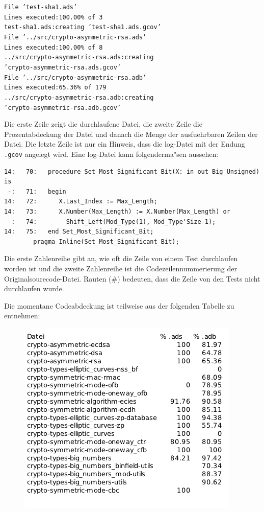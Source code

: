 {\tt File 'test-sha1.ads'\\
Lines executed:100.00\% of 3\\
test-sha1.ads:creating 'test-sha1.ads.gcov'\\

File '../src/crypto-asymmetric-rsa.ads'\\
Lines executed:100.00\% of 8\\
../src/crypto-asymmetric-rsa.ads:creating\\ 'crypto-asymmetric-rsa.ads.gcov'\\

File '../src/crypto-asymmetric-rsa.adb'\\
Lines executed:65.36\% of 179\\
../src/crypto-asymmetric-rsa.adb:creating\\ 'crypto-asymmetric-rsa.adb.gcov'\\}

Die erste Zeile zeigt die durchlaufene Datei, die zweite Zeile die
Prozentabdeckung der Datei und danach die Menge der ausfuehrbaren
Zeilen der Datei. Die letzte Zeile ist nur ein Hinweis, dass die
log-Datei mit der Endung {\tt .gcov} angelegt wird.  Eine log-Datei
kann folgenderma"sen aussehen:
\begin{lstlisting} 
14:   70:   procedure Set_Most_Significant_Bit(X: in out Big_Unsigned) is
 -:   71:   begin
14:   72:      X.Last_Index := Max_Length;
14:   73:      X.Number(Max_Length) := X.Number(Max_Length) or
 -:   74:        Shift_Left(Mod_Type(1), Mod_Type'Size-1);
14:   75:   end Set_Most_Significant_Bit; 
	    pragma Inline(Set_Most_Significant_Bit);
\end{lstlisting}

Die erste Zahlenreihe gibt an, wie oft die Zeile von einem Test
durchlaufen worden ist und die zweite Zahlenreihe ist die
Codezeilennummerierung der Originalsourecode-Datei.  Rauten (\#)
bedeuten, dass die Zeile von den Tests nicht durchlaufen wurde.

Die momentane Codeabdeckung ist teilweise aus der folgenden Tabelle zu
entnehmen:
\begin{figure}[htp]
\centering
\includegraphics[scale=0.5,bb=0 0 385 567]{tabelle_gcov.png}
\caption{}
\label{}
\end{figure}

